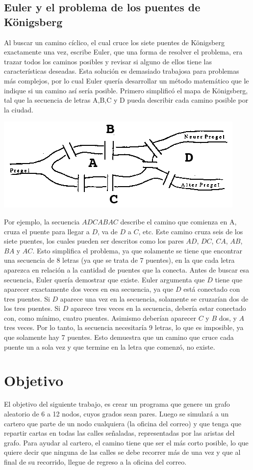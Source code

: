 \documentclass[12pt]{article}
\begin{document}
\subsection{Euler y el problema de los puentes de K\"{o}nigsberg}
Al buscar un camino cíclico, el cual cruce los siete puentes de K\"{o}nigsberg exactamente una vez, escribe Euler, que una forma de resolver el problema, era trazar todos los caminos posibles y revisar si alguno de ellos tiene las características deseadas. Esta solución es demasiado trabajosa para problemas más complejos, por lo cual Euler quería desarrollar un método matemático que le indique si un camino así sería posible. Primero simplificó el mapa de K\"{o}nigsberg, tal que la secuencia de letras A,B,C y D pueda describir cada camino posible por la ciudad.
\begin{center}
\includegraphics[scale=0.7]{pregelbruecken.png}
\end{center}
Por ejemplo, la secuencia $ADCABAC$ describe el camino que comienza en A, cruza el puente para llegar a $D$, va de $D$ a $C$, etc. Este camino cruza seis de los siete puentes, los cuales pueden ser descritos como los pares $AD$, $DC$, $CA$, $AB$, $BA$ y $AC$. Esto simplifica el problema, ya que solamente se tiene que encontrar una secuencia de 8 letras (ya que se trata de 7 puentes), en la que cada letra aparezca en relación a la cantidad de puentes que la conecta. Antes de buscar esa secuencia, Euler quería demostrar que existe. Euler argumenta que $D$ tiene que aparecer exactamente dos veces en esa secuencia, ya que $D$ está conectado con tres puentes. Si $D$ aparece una vez en la secuencia, solamente se cruzarían dos de los tres puentes. Si $D$ aparece tres veces en la secuencia, debería estar conectado con, como mínimo, cuatro puentes. Asimismo deberían aparecer $C$ y $B$ dos, y $A$ tres veces. Por lo tanto, la secuencia necesitaría 9 letras, lo que es imposible, ya que solamente hay 7 puentes. Esto demuestra que un camino que cruce cada puente un a sola vez y que termine en la letra que comenzó, no existe. 
\section{Objetivo}
El objetivo del siguiente trabajo, es crear un programa que genere un grafo aleatorio de 6 a 12 nodos, cuyos grados sean pares. Luego se simular\'{a} a un cartero que parte de un nodo cualquiera (la oficina del correo) y que tenga que repartir cartas en todas las calles señaladas,  representadas por las aristas del grafo. Para ayudar al cartero, el camino tiene que ser el m\'{a}s corto posible, lo que quiere decir que ninguna de las calles se debe recorrer m\'{a}s de una vez y que al final de su recorrido, llegue de regreso a la oficina del correo. 
\end{document}
